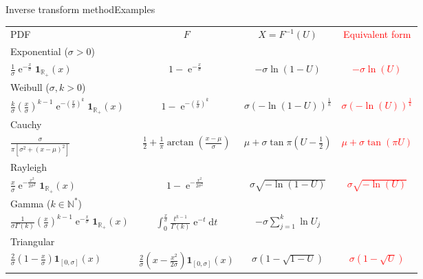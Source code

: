 \documentclass{beamer}
\newcommand{\Nset}{\mathbb{N}}
\newcommand{\Rset}{\mathbb{R}}
\newcommand{\id}{\mathrm{d}}
\newcommand{\iexp}{\operatorname{e}}
\newcommand{\xgj}{x}
\newcommand{\demi}{\frac{1}{2}}
\newcommand{\Ugj}{U}
\newcommand{\Xgj}{X}
\newcommand{\indic}[1]{{\mathbf 1}_{#1}}
\begin{document}
\begin{frame}{Inverse transform method}{Examples}

\tiny{
\hspace*{-0.4truecm}\begin{tabular}{lccc}
PDF & $F$ & $\Xgj=F^{-1}(\Ugj)$ & \textcolor{red}{Equivalent form} \\
\cline{1-4}
Exponential ($\sigma>0$)\\
$\frac{1}{\sigma}\iexp^{-\frac{\xgj}{\sigma}}\indic{\Rset_+}(\xgj)$ & $1-\iexp^{-\frac{\xgj}{\sigma}}$ & $-\sigma\ln(1-\Ugj)$ & \textcolor{red}{$-\sigma\ln(\Ugj)$} \\
\hline
Weibull ($\sigma,k>0$)\\
$\frac{k}{\sigma}(\frac{\xgj}{\sigma})^{k-1}\iexp^{-(\frac{\xgj}{\sigma})^k}\indic{\Rset_+}(\xgj)$ &  $1-\iexp^{-(\frac{\xgj}{\sigma})^k}$ & $\sigma(-\ln(1-\Ugj))^{\frac{1}{k}}$ & \textcolor{red}{$\sigma(-\ln(\Ugj))^{\frac{1}{k}}$} \\
\hline
Cauchy\\
$\frac{\sigma}{\pi[\sigma^2+(\xgj-\mu)^2]}$ & $\demi+\frac{1}{\pi}\arctan(\frac{\xgj-\mu}{\sigma})$ & $\mu+\sigma\tan\pi(\Ugj-\demi)$ & \textcolor{red}{$\mu+\sigma\tan(\pi\Ugj)$} \\
\hline
Rayleigh\\
$\frac{\xgj}{\sigma}\iexp^{-\frac{\xgj^2}{2\sigma^2}}\indic{\Rset_+}(\xgj)$ & $1-\iexp^{-\frac{\xgj^2}{2\sigma^2}}$ & $\sigma\sqrt{-\ln(1-\Ugj)}$ & \textcolor{red}{$\sigma\sqrt{-\ln(\Ugj)}$} \\
\hline
Gamma ($k\in\Nset^*$)\\
$\frac{1}{\sigma\Gamma(k)}(\frac{\xgj}{\sigma})^{k-1}\iexp^{-\frac{\xgj}{\sigma}}\indic{\Rset_+}(\xgj)$ & $\int_0^{\frac{\xgj}{\sigma}}\frac{t^{k-1}}{\Gamma(k)}\iexp^{-t}\id t$ & $-\sigma\sum_{j=1}^k\ln\Ugj_j$ & \\
\hline
Triangular\\
$\frac{2}{\sigma}(1-\frac{\xgj}{\sigma})\indic{[0,\sigma]}(\xgj)$ & $\frac{2}{\sigma}(\xgj-\frac{\xgj^2}{2\sigma})\indic{[0,\sigma]}(\xgj)$ & $\sigma(1-\sqrt{1-\Ugj})$ & \textcolor{red}{$\sigma(1-\sqrt{\Ugj})$} \\
\end{tabular}}

\end{frame}
\end{document}
